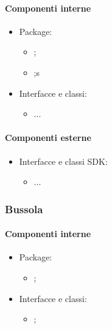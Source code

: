 \documentclass[../Funzionalita.tex]{subfiles}
\begin{document}
			\paragraph*{Componenti interne}
			\begin{itemize}
			
				\item Package:
				\begin{itemize}
					\item[] \navigator;
					\item[] \algorithm;s
				\end{itemize}
				
				\item Interfacce e classi:
				\begin{itemize}
					\item[] ...
				\end{itemize}
				
			\end{itemize}
			
			
			\paragraph*{Componenti esterne}
			
			\begin{itemize}
				\item Interfacce e classi SDK:
				\begin{itemize}
					\item[] ...
				\end{itemize}
			\end{itemize}
		
		
		\subsubsection{Bussola}
		
			\paragraph*{Componenti interne}
			\begin{itemize}
			
				\item Package:
				\begin{itemize}
					\item[] \compass;
				\end{itemize}
				
				\item Interfacce e classi:
				\begin{itemize}
					\item[] \Compass;
				\end{itemize}
				
			\end{itemize}
			
\end{document}
